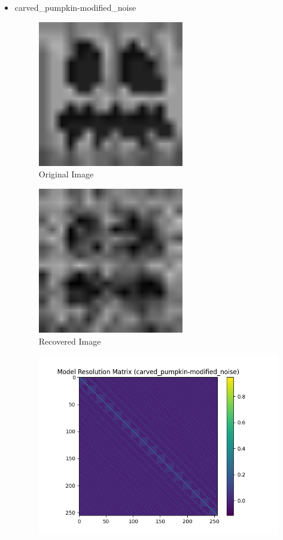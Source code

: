 \documentclass{article}
\begin{document}
\begin{itemize}
        \item carved\_pumpkin-modified\_noise
    \begin{figure}[h]
        \centering
        \includegraphics[width=0.6\textwidth]{images/greyscale/carved_pumpkin-modified.png}
        \caption{Original Image}
    \end{figure}
    \begin{figure}[h]
        \centering
        \includegraphics[width=0.6\textwidth]{images/outputs/noise/carved_pumpkin-modified_noise.png}
        \caption{Recovered Image}
    \end{figure}
    \begin{figure}[h]
        \centering
        \includegraphics[width=1\textwidth]{images/outputs/modelres/carved_pumpkin-modified_noise.png}

\end{figure}
\end{itemize}
\end{document}
